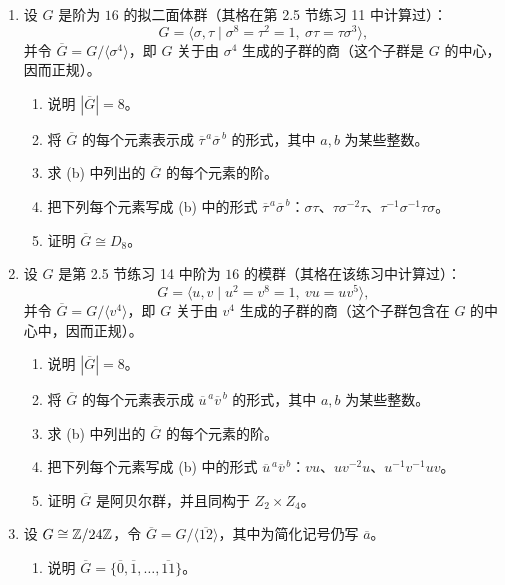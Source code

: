 \begin{enumerate}[label=\arabic*.]
\begin{enumerate}[label=(\alph*)]
    \item 求 $\overline G$ 的中心，并描述 $\overline G/Z(\overline G)$ 的同构类型。
  \end{enumerate}
  \item 设 $G$ 是阶为 $16$ 的拟二面体群（其格在第 2.5 节练习 11 中计算过）：
  \[
    G=\langle\sigma,\tau\mid \sigma^8=\tau^2=1,
    \ \sigma\tau=\tau\sigma^3\rangle,
  \]
  并令 $\overline G=G/\langle\sigma^4\rangle$，即 $G$ 关于由 $\sigma^4$ 生成的子群的商（这个子群是 $G$ 的中心，因而正规）。
  \begin{enumerate}[label=(\alph*)]
    \item 说明 $|\overline G|=8$。
    \item 将 $\overline G$ 的每个元素表示成 $\overline\tau^{\,a}\overline\sigma^{\,b}$ 的形式，其中 $a,b$ 为某些整数。
    \item 求 (b) 中列出的 $\overline G$ 的每个元素的阶。
    \item 把下列每个元素写成 (b) 中的形式 $\overline\tau^{\,a}\overline\sigma^{\,b}$：$\sigma\tau$、$\tau\sigma^{-2}\tau$、$\tau^{-1}\sigma^{-1}\tau\sigma$。
    \item 证明 $\overline G\cong D_8$。
  \end{enumerate}
  \item 设 $G$ 是第 2.5 节练习 14 中阶为 $16$ 的模群（其格在该练习中计算过）：
  \[
    G=\langle u,v\mid u^2=v^8=1,
    \ vu=uv^5\rangle,
  \]
  并令 $\overline G=G/\langle v^4\rangle$，即 $G$ 关于由 $v^4$ 生成的子群的商（这个子群包含在 $G$ 的中心中，因而正规）。
  \begin{enumerate}[label=(\alph*)]
    \item 说明 $|\overline G|=8$。
    \item 将 $\overline G$ 的每个元素表示成 $\overline u^{\,a}\overline v^{\,b}$ 的形式，其中 $a,b$ 为某些整数。
    \item 求 (b) 中列出的 $\overline G$ 的每个元素的阶。
    \item 把下列每个元素写成 (b) 中的形式 $\overline u^{\,a}\overline v^{\,b}$：$vu$、$uv^{-2}u$、$u^{-1}v^{-1}uv$。
    \item 证明 $\overline G$ 是阿贝尔群，并且同构于 $Z_2\times Z_4$。
  \end{enumerate}
  \item 设 $G\cong\mathbb{Z}/24\mathbb{Z}$，令 $\overline G=G/\langle\overline{12}\rangle$，其中为简化记号仍写 $\overline a$。
  \begin{enumerate}[label=(\alph*)]
    \item 说明 $\overline G=\{\overline0,\overline1,\ldots,\overline{11}\}$。

\end{enumerate}
\end{enumerate}

